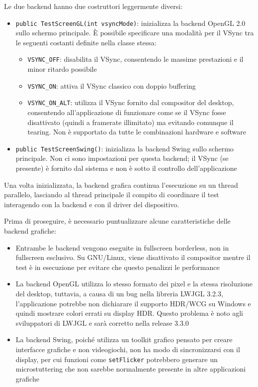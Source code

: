 Le due backend hanno due costruttori leggermente diversi:
\begin{itemize}
	\item \texttt{public TestScreenGL(int vsyncMode)}: inizializza la backend OpenGL 2.0 sullo schermo principale. È possibile specificare una modalità per il VSync tra le seguenti costanti definite nella classe stessa:
	\begin{itemize}
		\item \texttt{VSYNC\_OFF}: disabilita il VSync, consentendo le massime prestazioni e il minor ritardo possibile
		\item \texttt{VSYNC\_ON}: attiva il VSync classico con doppio buffering
		\item \texttt{VSYNC\_ON\_ALT}: utilizza il VSync fornito dal compositor del desktop, consentendo all'applicazione di funzionare come se il VSync fosse disattivato (quindi a framerate illimitato) ma evitando comunque il tearing. Non è supportato da tutte le combinazioni hardware e software
	\end{itemize}
	\item \texttt{public TestScreenSwing()}: inizializza la backend Swing sullo schermo principale. Non ci sono impostazioni per questa backend; il VSync (se presente) è fornito dal sistema e non è sotto il controllo dell'applicazione
\end{itemize}

Una volta inizializzata, la backend grafica continua l'esecuzione su un thread parallelo, lasciando al thread principale il compito di coordinare il test interagendo con la backend e con il driver del dispositivo.

Prima di proseguire, è necessario puntualizzare alcune caratteristiche delle backend grafiche:\begin{itemize}
	\item Entrambe le backend vengono eseguite in fullscreen borderless, non in fullscreen esclusivo. Su GNU/Linux, viene disattivato il compositor mentre il test è in esecuzione per evitare che questo penalizzi le performance
	\item La backend OpenGL utilizza lo stesso formato dei pixel e la stessa risoluzione del desktop, tuttavia, a causa di un bug nella libreria LWJGL 3.2.3, l'applicazione potrebbe non dichiarare il supporto HDR/WCG su Windows e quindi mostrare colori errati su display HDR. Questo problema è noto agli sviluppatori di LWJGL e sarà corretto nella release 3.3.0
	\item La backend Swing, poiché utilizza un toolkit grafico pensato per creare interfacce grafiche e non videogiochi, non ha modo di sincronizzarsi con il display, per cui funzioni come \texttt{setFlicker} potrebbero generare un microstuttering che non sarebbe normalmente presente in altre applicazioni grafiche
\end{itemize}

